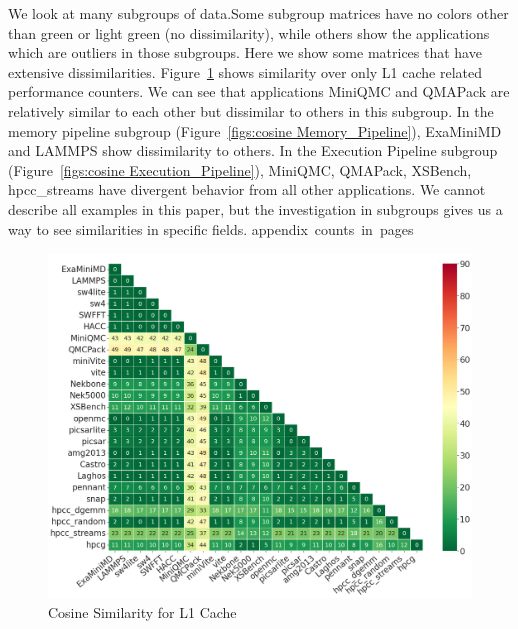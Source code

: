 We look at many subgroups of data.Some subgroup matrices have no colors other than green or light green (no dissimilarity), while others show the applications which are outliers in those subgroups. Here we show some matrices that have extensive dissimilarities. Figure~\ref{figs:cosine L1_D_Cache} shows similarity over only L1 cache related performance counters. We can see that applications MiniQMC and QMAPack are relatively
similar to each other but dissimilar to others in this subgroup. In the memory pipeline subgroup (Figure~\ref{figs:cosine Memory_Pipeline}), ExaMiniMD and LAMMPS show dissimilarity to others. In the Execution Pipeline subgroup (Figure~\ref{figs:cosine Execution_Pipeline}), MiniQMC, QMAPack, XSBench, hpcc\_streams have divergent behavior from all
other applications.
We cannot describe all examples in this paper, but the investigation in subgroups gives us a way to see similarities in specific fields. \si{appendix counts in pages}

\begin{figure}[ht]
\centering
\includegraphics[width=0.9\linewidth]{figs/L1_Cache_font20.png}
\caption{Cosine Similarity for L1 Cache }
\label{figs:cosine L1_D_Cache}
\end{figure}

